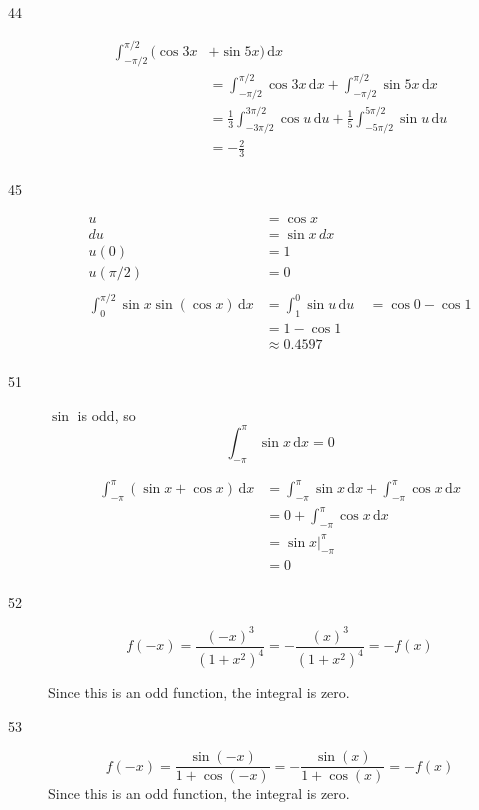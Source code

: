 \documentclass{exam}
\begin{document}
\begin{description}
\item[44]
\begin{align*}
  \int_{-\pi/2}^{\pi/2} (\cos 3x &+ \sin 5x) \, \mathrm{d}x \\
  &= \int_{-\pi/2}^{\pi/2} \cos 3x \, \mathrm{d}x + \int_{-\pi/2}^{\pi/2} \sin 5x \, \mathrm{d}x \\
  &= \frac{1}{3} \int_{-3\pi/2}^{3\pi/2} \cos u \, \mathrm{d}u + \frac{1}{5} \int_{-5\pi/2}^{5 \pi/2} \sin u \, \mathrm{d}u \\
  &= - \frac{2}{3} \\
\end{align*}

\item[45]
\begin{align*}
  u &= \cos x \\
  du &= \sin x \, dx \\
  u(0) &= 1 \\
  u(\pi/2) &= 0 \\
\\
  \int_0^{\pi/2} \sin x \sin(\cos x) \, \mathrm{d}x &= \int_1^0 \sin u \, \mathrm{d}u \
  &= \cos 0 - \cos 1 \\
  &= 1 - \cos 1 \\
  &\approx 0.4597 \\
\end{align*}

\item[51]
$\sin$ is odd, so
\[
  \int_{-\pi}^{\pi} \sin x \, \mathrm{d}x = 0
\]

\begin{align*}
  \int_{-\pi}^{\pi} (\sin x +  \cos x) \, \mathrm{d}x &= \int_{-\pi}^{\pi} \sin x \, \mathrm{d}x + \int_{-\pi}^{\pi} \cos x \, \mathrm{d}x  \\
  &= 0 + \int_{-\pi}^{\pi} \cos x \, \mathrm{d}x \\
  &= \sin x \bigg|_{-\pi}^{\pi} \\
  &= 0 \\
\end{align*}

\item[52]
\[
  f(-x) = \frac{(-x)^3}{(1 + x^2)^4} = - \frac{(x)^3}{(1 + x^2)^4} = - f(x)
\]

Since this is an odd function, the integral is zero.

\item[53]
\[
  f(-x) = \frac{\sin(-x)}{1 + \cos(-x)} = - \frac{\sin(x)}{1 + \cos(x)} = - f(x)
\]
Since this is an odd function, the integral is zero.


\end{description}
\end{document}
